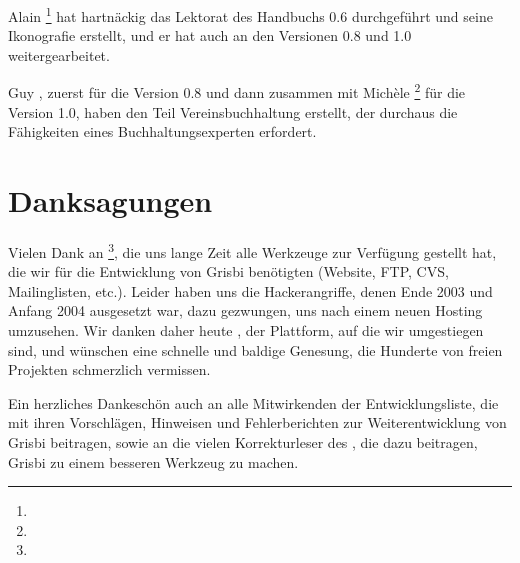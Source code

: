 Alain \footnote{\urlAlainLetientEmail{}} hat hartnäckig das Lektorat des Handbuchs 0.6 durchgeführt und seine Ikonografie erstellt, und er hat auch an den Versionen 0.8 und 1.0 weitergearbeitet.

Guy , zuerst für die Version 0.8 und dann zusammen mit Michèle \footnote{\urlMicheleBondilEmail{}} für die Version 1.0, haben den Teil Vereinsbuchhaltung erstellt, der durchaus die Fähigkeiten eines Buchhaltungsexperten erfordert.

\section{Danksagungen\label{introduction-thanks}}


Vielen Dank an \footnote{\urlTuxFamily{}}, die uns lange Zeit alle Werkzeuge zur Verfügung gestellt hat, die wir für die Entwicklung von Grisbi benötigten (Website, FTP, CVS, Mailinglisten, etc.). Leider haben uns die Hackerangriffe, denen  Ende 2003 und Anfang 2004 ausgesetzt war, dazu gezwungen, uns nach einem neuen Hosting umzusehen. Wir danken daher heute , der Plattform, auf die wir umgestiegen sind, und wünschen  eine schnelle und baldige Genesung, die Hunderte von freien Projekten schmerzlich vermissen.

Ein herzliches Dankeschön auch an alle Mitwirkenden der Entwicklungsliste, die mit ihren Vorschlägen, Hinweisen und Fehlerberichten zur Weiterentwicklung von Grisbi beitragen, sowie an die vielen Korrekturleser des , die dazu beitragen, Grisbi zu einem besseren Werkzeug zu machen.

